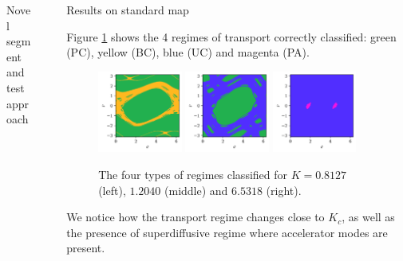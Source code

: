 \documentclass[final]{beamer}
\newlength{\sepwidth}
\newlength{\colwidth}
\newcommand{\separatorcolumn}{\begin{column}{\sepwidth}\end{column}}
\begin{document}
\begin{frame}[t]
\begin{columns}[t]
\begin{column}{\colwidth}
\begin{block}{Novel segment and test approach}
\end{block}



\end{column}
 
\separatorcolumn
\begin{column}{\colwidth}

   \begin{block}{Results on standard map}

    Figure \ref{label} shows the 4 regimes of transport correctly classified: green (PC), yellow (BC), blue (UC) and magenta (PA).

    \begin{figure}
      \centering
      \includegraphics[width = 0.3\textwidth]{label_000.8127.png}
      \includegraphics[width = 0.3\textwidth]{label_001.2040.png}
      \includegraphics[width = 0.3\textwidth]{label_006.5318.png}
      \caption{The four types of regimes classified for $K=0.8127$ (left), $1.2040$ (middle) and $6.5318$ (right).}
      \label{label}
  \end{figure}

 We notice how the transport regime changes close to $K_c$, as well as the presence of superdiffusive regime where accelerator modes are present.



\end{block}
\end{column}
\end{columns}
\end{frame}
\end{document}

